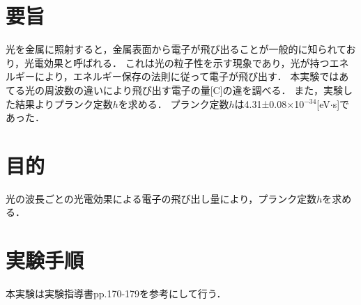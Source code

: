\documentclass[a4paper,11pt]{ltjsarticle}
\begin{document}
\section{要旨}
光を金属に照射すると，金属表面から電子が飛び出ることが一般的に知られており，光電効果と呼ばれる．
これは光の粒子性を示す現象であり，光が持つエネルギーにより，エネルギー保存の法則に従って電子が飛び出す．
本実験ではあてる光の周波数の違いにより飛び出す電子の量[C]の違を調べる．
また，実験した結果よりプランク定数$h$を求める．
プランク定数$h$は4.31±0.08×10$^{-34}$[eV$\cdot$s]であった．
\section{目的}
光の波長ごとの光電効果による電子の飛び出し量により，プランク定数$h$を求める．
\section{実験手順}
本実験は実験指導書pp.170-179を参考にして行う．
\end{document}
